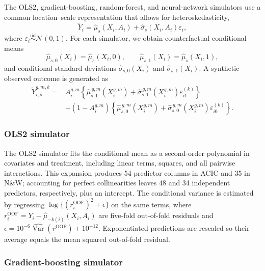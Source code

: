 \begin{landscape}
The OLS2, gradient-boosting, random-forest, and neural-network simulators use a common location--scale representation that allows for heteroskedasticity,
\[
\widetilde Y_i
=
\widehat{\mu}_s(X_i,A_i)
+
\widehat{\sigma}_s(X_i,A_i)\varepsilon_i,
\]
where \(\varepsilon_i\overset{\mathrm{iid}}{\sim}\mathcal N(0,1)\). For each simulator, we obtain counterfactual conditional means
\[
\widehat{\mu}_{s,0}(X_i)
=
\widehat{\mu}_s(X_i,0),
\qquad
\widehat{\mu}_{s,1}(X_i)
=
\widehat{\mu}_s(X_i,1),
\]
and conditional standard deviations \(\widehat{\sigma}_{s,0}(X_i)\) and \(\widehat{\sigma}_{s,1}(X_i)\). A synthetic observed outcome is generated as
\[
\begin{aligned}
\widetilde Y_{i,s}^{g,m,k}
={}&
A_i^{g,m}
\left\{
\widehat{\mu}_{s,1}^{\,g,m}(X_i^{g,m})
+
\widehat{\sigma}_{s,1}^{\,g,m}(X_i^{g,m})\varepsilon_{i1}^{(k)}
\right\}\\
&+
\left(1-A_i^{g,m}\right)
\left\{
\widehat{\mu}_{s,0}^{\,g,m}(X_i^{g,m})
+
\widehat{\sigma}_{s,0}^{\,g,m}(X_i^{g,m})\varepsilon_{i0}^{(k)}
\right\}.
\end{aligned}
\]

\subsubsection{OLS2 simulator}

The OLS2 simulator fits the conditional mean as a second-order polynomial in covariates and treatment, including linear terms, squares, and all pairwise interactions. This expansion produces 54 predictor columns in ACIC and 35 in N\&W; accounting for perfect collinearities leaves 48 and 34 independent predictors, respectively, plus an intercept. The conditional variance is estimated by regressing \(\log\{(r_i^{\mathrm{OOF}})^2+\epsilon\}\) on the same terms, where \(r_i^{\mathrm{OOF}}=Y_i-\widehat\mu_{-k(i)}(X_i,A_i)\) are five-fold out-of-fold residuals and \(\epsilon=10^{-6}\widehat{\operatorname{Var}}(r^{\mathrm{OOF}})+10^{-12}\). Exponentiated predictions are rescaled so their average equals the mean squared out-of-fold residual.

\subsubsection{Gradient-boosting simulator}


\end{landscape}
